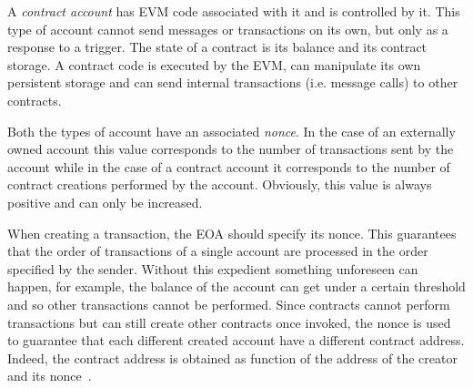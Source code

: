 A \emph{contract account} has EVM code associated with it and is controlled by
it. This type of account cannot send messages or transactions on its own, but
only as a response to a trigger. The state of a contract is its balance and its
contract storage. A contract code is executed by the EVM, can manipulate its own
persistent storage and can send internal transactions (i.e. message calls) to
other contracts.

Both the types of account have an associated \emph{nonce}. In the case of an
externally owned account this value corresponds to the number of transactions
sent by the account while in the case of a contract account it corresponds to
the number of contract creations performed by the account. Obviously, this value
is always positive and can only be increased.

When creating a transaction, the EOA should specify its nonce. This guarantees
that the order of transactions of a single account are processed in the order
specified by the sender. Without this expedient something unforeseen can happen,
for example, the balance of the account can get under a certain threshold and so
other transactions cannot be performed. Since contracts cannot perform
transactions but can still create other contracts once invoked, the nonce is
used to guarantee that each different created account have a different contract
address. Indeed, the contract address is obtained as function of the address of
the creator and its nonce~\cite{wood2018ethereum}.

